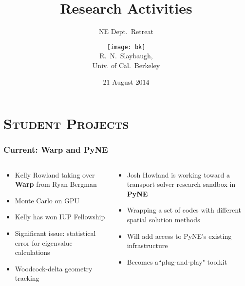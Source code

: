 \documentclass[xcolor=x11names,compress]{beamer}
\renewcommand{\(}{\begin{columns}}
\renewcommand{\)}{\end{columns}}
\newcommand{\<}[1]{\begin{column}{#1}}
\renewcommand{\>}{\end{column}}
\begin{document}
\begin{frame}
\title{Research Activities}
\subtitle{NE Dept.\ Retreat}
\author{
        \texttt{[image: bk]}\\R.\ N.\ Slaybaugh, \\ Univ. of Cal.\ Berkeley}

\date{21 August 2014}
\titlepage
\end{frame}


\section{\scshape Student Projects}
\begin{frame}[fragile]
  \frametitle{Current: Warp and PyNE}

	\begin{columns}
  	\begin{column}{0.5\textwidth}
	\begin{itemize}
	  \item Kelly Rowland taking over \textbf{Warp} from Ryan Bergman
	  \item Monte Carlo on GPU
	  \item Kelly has won IUP Fellowship
	  \item Significant issue: statistical error for eigenvalue calculations
	  \item Woodcock-delta geometry tracking
	\end{itemize}
  	\end{column}
 	\begin{column}{0.5\textwidth}
 	 \begin{itemize}
       \item Josh Howland is working toward a transport solver research sandbox in \textbf{PyNE} 
       \item Wrapping a set of codes with different spatial solution methods
       \item Will add access to PyNE's existing infrastructure
       \item Becomes a``plug-and-play" toolkit
 	 \end{itemize}
  	\end{column}
	\end{columns}

\end{frame}
\end{document}
